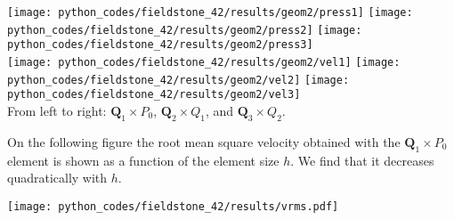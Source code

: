 \begin{center}
\texttt{[image: python\_codes/fieldstone\_42/results/geom2/press1]}
\texttt{[image: python\_codes/fieldstone\_42/results/geom2/press2]}
\texttt{[image: python\_codes/fieldstone\_42/results/geom2/press3]}\\
\texttt{[image: python\_codes/fieldstone\_42/results/geom2/vel1]}
\texttt{[image: python\_codes/fieldstone\_42/results/geom2/vel2]}
\texttt{[image: python\_codes/fieldstone\_42/results/geom2/vel3]}\\
{\captionfont From left to right: ${\bm Q}_1\times P_0$, ${\bm Q}_2\times Q_1$, 
and ${\bm Q}_3\times Q_2$.}
\end{center}


On the following figure the root mean square velocity obtained with the 
${\bm Q}_1\times P_0$ element is shown as a function of 
the element size $h$. We find that it decreases quadratically with $h$. 
\begin{center}
\texttt{[image: python\_codes/fieldstone\_42/results/vrms.pdf]}
\end{center}


